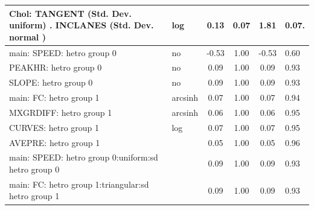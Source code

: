 \begin{table}
\begin{center}
\begin{tabular}{|l|l|c|c|c|l|}
			\hline
			 Chol: TANGENT (Std. Dev. uniform) . INCLANES (Std. Dev.   normal ) & log & 0.13 & 0.07 & 1.81 & 0.07. \\
			\hline
			main: SPEED: hetro group 0 & no & -0.53 & 1.00 & -0.53 & 0.60 \\
			\hline
			PEAKHR: hetro group 0 & no & 0.09 & 1.00 & 0.09 & 0.93 \\
			\hline
			SLOPE: hetro group 0 & no & 0.09 & 1.00 & 0.09 & 0.93 \\
			\hline
			main: FC: hetro group 1 & arcsinh & 0.07 & 1.00 & 0.07 & 0.94 \\
			\hline
			MXGRDIFF: hetro group 1 & arcsinh & 0.06 & 1.00 & 0.06 & 0.95 \\
			\hline
			CURVES: hetro group 1 & log & 0.07 & 1.00 & 0.07 & 0.95 \\
			\hline
			AVEPRE: hetro group 1 &  & 0.05 & 1.00 & 0.05 & 0.96 \\
			\hline
			main: SPEED: hetro group 0:uniform:sd  hetro group 0 &  & 0.09 & 1.00 & 0.09 & 0.93 \\
			\hline
			main: FC: hetro group 1:triangular:sd  hetro group 1 &  & 0.09 & 1.00 & 0.09 & 0.93 \\
			\hline
		\end{tabular}
	\end{center}
\end{table}